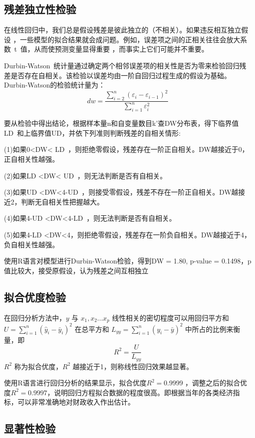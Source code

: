 \documentclass [a4paper]{article}
\begin{document}
\subsection{残差独立性检验}

在线性回归中，我们总是假设残差是彼此独立的（不相关）。如果违反相互独立假设 ，一些模型的拟合结果就会成问题。例如，误差项之间的正相关往往会放大系数 t 值，从而使预测变量显得重要 ，而事实上它们可能并不重要。

Durbin-Watson 统计量通过确定两个相邻误差项的相关性是否为零来检验回归残差是否存在自相关。该检验以误差均由一阶自回归过程生成的假设为基础。Durbin-Watson的检验统计量为：
$$
dw= \frac{\sum_{i=2}^n(\varepsilon_i-\varepsilon_{i-1})^2}{\sum_{i=1}^n\varepsilon_i^2}
$$


要从检验中得出结论，根据样本量n和自变量数目k'查DW分布表，得下临界值LD 和上临界值UD，并依下列准则判断残差的自相关情形:

(1)如果0<DW< LD ，则拒绝零假设，残差存在一阶正自相关。DW越接近于0，正自相关性越强。

(2)如果LD <DW< UD ，则无法判断是否有自相关。

(3)如果UD <DW<4-UD ，则接受零假设，残差不存在一阶正自相关。DW越接近2，判断无自相关性把握越大。

(4)如果4-UD <DW<4-LD ，则无法判断是否有自相关。

(5)如果4-LD <DW<4，则拒绝零假设，残差存在一阶负自相关。DW越接近于4，负自相关性越强。

使用R语言对模型进行Durbin-Watson检验，得到DW = 1.80, p-value = 0.1498，p值比较大，接受原假设，认为残差之间互相独立


\subsection{拟合优度检验}

在回归分析方法中，$y$ 与 $x_1,x_2...x_p$ 线性相关的密切程度可以用回归平方和 $U =\sum_{i=1}^{n}(\hat y_i -\bar y_i)^2$ 在总平方和 $L_{yy} = \sum_{i=1}^n (y_i - \bar y )^2$ 中所占的比例来衡量，即
$$
R^2= \frac{U}{L_{yy}}
$$
$R^2$ 称为拟合优度，$R^2$ 越接近于1，则称线性回归效果越显著。

使用R语言进行回归分析的结果显示，拟合优度$R^2 = 0.9999$ ，调整之后的拟合优度$R^2 = 0.9997$，说明回归方程拟合数据的程度很高。即根据当年的各类经济指标，可以非常准确地对财政收入作出估计。

\subsection{显著性检验}
\end{document}
